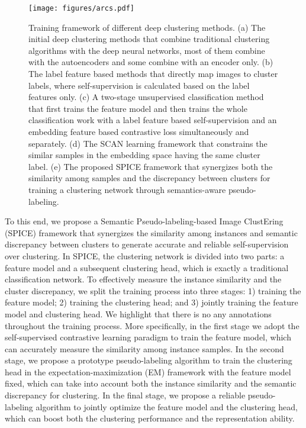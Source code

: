 \documentclass[journal]{IEEEtran}
\begin{document}
\begin{figure*}[bt!]
    \centering
    \texttt{[image: figures/arcs.pdf]}
    \caption{Training framework of different  deep clustering methods. (a) The initial deep clustering methods that combine traditional clustering algorithms with the deep neural networks, most of them combine with the autoencoders and some combine with an encoder only. (b) The label feature based methods that directly map images to cluster labels, where self-supervision is calculated based on the label features only. (c) A two-stage unsupervised classification method that first trains the feature model and then trains the whole classification work with a label feature based self-supervision and an embedding feature based contrastive loss simultaneously and separately. (d) The SCAN learning framework that constrains the similar samples in the embedding space having the same cluster label. (e) The proposed SPICE framework that synergizes both the similarity among samples and the discrepancy between clusters for training a clustering network through semantics-aware pseudo-labeling.}
    \label{fig_arcs}
\end{figure*}

To this end,  we propose a Semantic Pseudo-labeling-based Image ClustEring (SPICE) framework that synergizes the similarity among instances and semantic discrepancy between clusters to generate accurate and reliable self-supervision over clustering.
In SPICE, the clustering network is divided into two parts: a feature model and a subsequent clustering head, which is exactly a traditional classification network.
To effectively measure the instance similarity and the cluster discrepancy, we split the training process into three stages: 1) training the feature model; 2) training the clustering head; and 3) jointly training the feature model and clustering head. We highlight that there is no any annotations throughout the training process.
More specifically, in the first stage we adopt the self-supervised contrastive learning paradigm to train the feature model, which can accurately measure the similarity among instance samples. In the second stage, we  propose a prototype pseudo-labeling algorithm to train the clustering head in the expectation-maximization (EM) framework with the feature model fixed, which can take into account both the instance similarity and the semantic discrepancy for clustering. In the final stage, we propose a reliable pseudo-labeling algorithm to jointly optimize the feature model and the clustering head, which can boost both the clustering performance and the representation ability.
\end{document}
